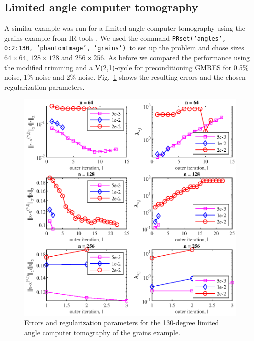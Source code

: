 \subsection{Limited angle computer tomography}
A similar example was run for a limited angle computer tomography using the grains example from IR tools \cite{art:GAZZ19}. We used the command \texttt{PRset('angles', 0:2:130, 'phantomImage', 'grains')} to set up the problem and chose sizes $64 \times 64$, $128 \times 128$ and $256 \times 256$. As before we compared the performance using the modified trimming and a V(2,1)-cycle for preconditioning GMRES for 0.5\% noise, 1\% noise and 2\% noise. Fig.~\ref{fig:limited_angle_grains_errs_and_reg_params} shows the resulting errors and the chosen regularization parameters.
\begin{figure}[htbp]
\begin{center}
\includegraphics{figures/limited_angle_grains_errs_and_reg_params}
\caption{Errors and regularization parameters for the 130-degree limited angle computer tomography of the grains example.}
\label{fig:limited_angle_grains_errs_and_reg_params}
\end{center}
\end{figure}


